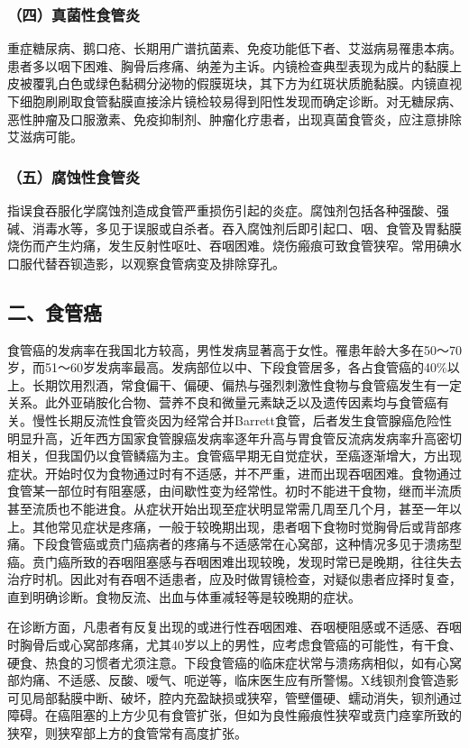 \subsubsection{（四）真菌性食管炎}

重症糖尿病、鹅口疮、长期用广谱抗菌素、免疫功能低下者、艾滋病易罹患本病。患者多以咽下困难、胸骨后疼痛、纳差为主诉。内镜检查典型表现为成片的黏膜上皮被覆乳白色或绿色黏稠分泌物的假膜斑块，其下方为红斑状质脆黏膜。内镜直视下细胞刷刷取食管黏膜直接涂片镜检较易得到阳性发现而确定诊断。对无糖尿病、恶性肿瘤及口服激素、免疫抑制剂、肿瘤化疗患者，出现真菌食管炎，应注意排除艾滋病可能。

\subsubsection{（五）腐蚀性食管炎}

指误食吞服化学腐蚀剂造成食管严重损伤引起的炎症。腐蚀剂包括各种强酸、强碱、消毒水等，多见于误服或自杀者。吞入腐蚀剂后即引起口、咽、食管及胃黏膜烧伤而产生灼痛，发生反射性呕吐、吞咽困难。烧伤瘢痕可致食管狭窄。常用碘水口服代替吞钡造影，以观察食管病变及排除穿孔。

\subsection{二、食管癌}

食管癌的发病率在我国北方较高，男性发病显著高于女性。罹患年龄大多在50～70岁，而51～60岁发病率最高。发病部位以中、下段食管居多，各占食管癌的40\%以上。长期饮用烈酒，常食偏干、偏硬、偏热与强烈刺激性食物与食管癌发生有一定关系。此外亚硝胺化合物、营养不良和微量元素缺乏以及遗传因素均与食管癌有关。慢性长期反流性食管炎因为经常合并Barrett食管，后者发生食管腺癌危险性明显升高，近年西方国家食管腺癌发病率逐年升高与胃食管反流病发病率升高密切相关，但我国仍以食管鳞癌为主。食管癌早期无自觉症状，至癌逐渐增大，方出现症状。开始时仅为食物通过时有不适感，并不严重，进而出现吞咽困难。食物通过食管某一部位时有阻塞感，由间歇性变为经常性。初时不能进干食物，继而半流质甚至流质也不能进食。从症状开始出现至症状明显常需几周至几个月，甚至一年以上。其他常见症状是疼痛，一般于较晚期出现，患者咽下食物时觉胸骨后或背部疼痛。下段食管癌或贲门癌病者的疼痛与不适感常在心窝部，这种情况多见于溃疡型癌。贲门癌所致的吞咽阻塞感与吞咽困难出现较晚，发现时常已是晚期，往往失去治疗时机。因此对有吞咽不适患者，应及时做胃镜检查，对疑似患者应择时复查，直到明确诊断。食物反流、出血与体重减轻等是较晚期的症状。

在诊断方面，凡患者有反复出现的或进行性吞咽困难、吞咽梗阻感或不适感、吞咽时胸骨后或心窝部疼痛，尤其40岁以上的男性，应考虑食管癌的可能性，有干食、硬食、热食的习惯者尤须注意。下段食管癌的临床症状常与溃疡病相似，如有心窝部灼痛、不适感、反酸、嗳气、呃逆等，临床医生应有所警惕。X线钡剂食管造影可见局部黏膜中断、破坏，腔内充盈缺损或狭窄，管壁僵硬、蠕动消失，钡剂通过障碍。在癌阻塞的上方少见有食管扩张，但如为良性瘢痕性狭窄或贲门痉挛所致的狭窄，则狭窄部上方的食管常有高度扩张。

